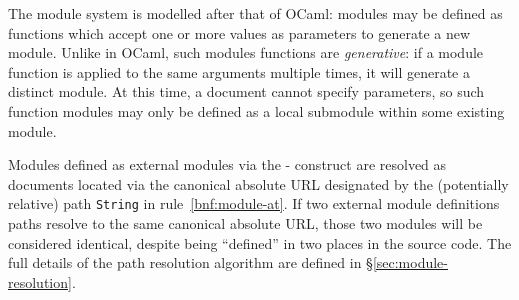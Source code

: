 The \Trilogy{} module system is modelled after that of OCaml: modules may
be defined as functions which accept one or more values as parameters
to generate a new module. Unlike in OCaml, such modules functions are \emph{generative}:
if a module function is applied to the same arguments multiple times, it will
generate a distinct module. At this time, a document cannot specify parameters,
so such function modules may only be defined as a local submodule within some
existing module.

Modules defined as external modules via the - construct
are resolved as documents located via the canonical absolute URL designated
by the (potentially relative) path \texttt{String} in rule~\ref{bnf:module-at}.
If two external module definitions paths resolve to the same canonical absolute
URL, those two modules will be considered identical, despite being ``defined''
in two places in the source code. The full details of the path resolution
algorithm are defined in \S\ref{sec:module-resolution}.

\begin{bnf}
     \\
     \\
     \\
     \\
     \\
     \\
     \\
     \\
     \\
\end{bnf}

